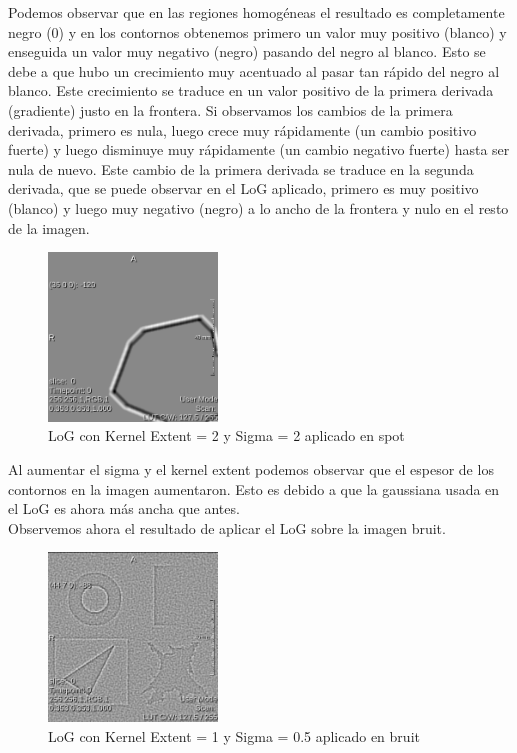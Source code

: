 \documentclass{article}
\begin{document}
Podemos observar que en las regiones homogéneas el resultado es completamente negro (0) y en
los contornos obtenemos primero un valor muy positivo (blanco) y enseguida un valor muy
negativo (negro) pasando del negro al blanco. Esto se debe a que hubo un crecimiento muy
acentuado al pasar tan rápido del negro al blanco. Este crecimiento se traduce en un valor
positivo de la primera derivada (gradiente) justo en la frontera. Si observamos los cambios
de la primera derivada, primero es nula, luego crece muy rápidamente (un cambio positivo
fuerte) y luego disminuye muy rápidamente (un cambio negativo fuerte) hasta ser nula de
nuevo. Este cambio de la primera derivada se traduce en la segunda derivada, que se puede
observar en el LoG aplicado, primero es muy positivo (blanco) y luego muy negativo (negro) a
lo ancho de la frontera y nulo en el resto de la imagen.\\

\begin{figure}[ht]
\begin{center}
    \includegraphics[width=0.4\textwidth]{3Laplaciano/3_ker_2_sigma_2.png} %
    \caption{LoG con Kernel Extent = 2 y Sigma = 2 aplicado en spot}
\end{center}
\end{figure}
\FloatBarrier

Al aumentar el sigma y el kernel extent podemos observar que el espesor de los contornos en la imagen aumentaron. Esto es debido a que la gaussiana usada en el LoG es ahora más ancha que antes.\\

Observemos ahora el resultado de aplicar el LoG sobre la imagen bruit.\\
\begin{figure}[ht]
\begin{center}
    \includegraphics[width=0.4\textwidth]{3Laplaciano/3_bruit_ker_1_sigma_5.png} %
    \caption{LoG con Kernel Extent = 1 y Sigma = 0.5 aplicado en bruit}
\end{center}
\end{figure}
\FloatBarrier
\end{document}

